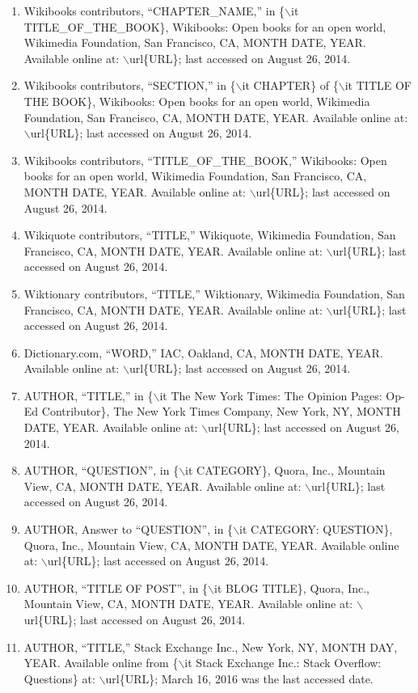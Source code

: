 \documentclass[letter,12pt]{article}
\begin{document}
\begin{enumerate}
\begin{enumerate}
	\item Wikibooks contributors, ``CHAPTER\_NAME,'' in \{$\backslash$it TITLE\_OF\_THE\_BOOK\}, Wikibooks: Open books for an open world, Wikimedia Foundation, San Francisco, CA, MONTH DATE, YEAR. Available online at: $\backslash$url\{URL\}; last accessed on August 26, 2014.
	\item Wikibooks contributors, ``SECTION,'' in \{$\backslash$it CHAPTER\} of \{$\backslash$it TITLE OF THE BOOK\}, Wikibooks: Open books for an open world, Wikimedia Foundation, San Francisco, CA, MONTH DATE, YEAR. Available online at: $\backslash$url\{URL\}; last accessed on August 26, 2014.
	\item Wikibooks contributors, ``TITLE\_OF\_THE\_BOOK,'' Wikibooks: Open books for an open world, Wikimedia Foundation, San Francisco, CA, MONTH DATE, YEAR. Available online at: $\backslash$url\{URL\}; last accessed on August 26, 2014.
	\item Wikiquote contributors, ``TITLE,'' Wikiquote, Wikimedia Foundation, San Francisco, CA, MONTH DATE, YEAR. Available online at: $\backslash$url\{URL\}; last accessed on August 26, 2014.
	\item Wiktionary contributors, ``TITLE,'' Wiktionary, Wikimedia Foundation, San Francisco, CA, MONTH DATE, YEAR. Available online at: $\backslash$url\{URL\}; last accessed on August 26, 2014.
	\item Dictionary.com, ``WORD,'' IAC, Oakland, CA, MONTH DATE, YEAR. Available online at: $\backslash$url\{URL\}; last accessed on August 26, 2014.
	\item AUTHOR, ``TITLE,'' in \{$\backslash$it The New York Times: The Opinion Pages: Op-Ed Contributor\}, The New York Times Company, New York, NY, MONTH DATE, YEAR. Available online at: $\backslash$url\{URL\}; last accessed on August 26, 2014.
	\item AUTHOR, ``QUESTION'', in \{$\backslash$it CATEGORY\}, Quora, Inc., Mountain View, CA, MONTH DATE, YEAR. Available online at: $\backslash$url\{URL\}; last accessed on August 26, 2014.
	\item AUTHOR, Answer to ``QUESTION'', in \{$\backslash$it CATEGORY: QUESTION\}, Quora, Inc., Mountain View, CA, MONTH DATE, YEAR. Available online at: $\backslash$url\{URL\}; last accessed on August 26, 2014.
	\item AUTHOR, ``TITLE OF POST'', in \{$\backslash$it BLOG TITLE\}, Quora, Inc., Mountain View, CA, MONTH DATE, YEAR. Available online at: $\backslash$url\{URL\}; last accessed on August 26, 2014.
	\item AUTHOR, ``TITLE,'' Stack Exchange Inc., New York, NY, MONTH DAY, YEAR. Available online from \{$\backslash$it Stack Exchange Inc.: Stack Overflow: Questions\} at: $\backslash$url\{URL\}; March 16, 2016 was the last accessed date.

\end{enumerate}
\end{enumerate}
\end{document}
